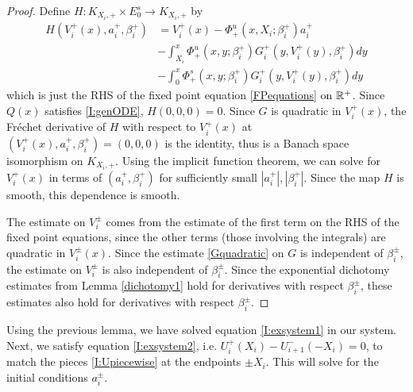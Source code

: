 \documentclass[thesis.tex]{subfiles}
\begin{document}
\begin{lemma}
\begin{proof}
Define $H: K_{X_i, +} \times E_0^s \rightarrow K_{X_i, +}$ by
\begin{align*}
H(V_i^+(x), a_i^+, \beta_i^+) &= V_i^+(x) - \Phi^u_+(x, X_i; \beta_i^+) a_i^+  \\
&- \int_{X_i}^x \Phi_+^u(x, y; \beta_i^+) G_i^+(y, V_i^+(y),\beta_i^+)dy \\
&- \int_0^x \Phi_+^s(x, y; \beta_i^+) G_i^+(y, V_i^+(y),\beta_i^+)dy 
\end{align*}
which is just the RHS of the fixed point equation \eqref{FPequations} on ${\mathbb R}^+$. Since $Q(x)$ satisfies \eqref{I:genODE}, $H(0, 0, 0) = 0$. Since $G$ is quadratic in $V_i^+(x)$, the Fr\'echet derivative of $H$ with respect to $V_i^+(x)$ at $(V_i^+(x), a_i^+, \beta_i^+) = (0, 0, 0)$ is the identity, thus is a Banach space isomorphism on $K_{X_i, +}$. Using the implicit function theorem, we can solve for $V_i^+(x)$ in terms of $(a_i^+, \beta_i^+)$ for sufficiently small $|a_i^+|, |\beta_i^+|$. Since the map $H$ is smooth, this dependence is smooth.

The estimate on $V_i^\pm$ comes from the estimate of the first term on the RHS of the fixed point equations, since the other terms (those involving the integrals) are quadratic in $V_i^\pm(x)$. Since the estimate \eqref{Gquadratic} on $G$ is independent of $\beta_i^\pm$, the estimate on {}$V_i^\pm$ is also independent of $\beta_i^\pm$. Since the exponential dichotomy estimates from Lemma \ref{dichotomy1} hold for derivatives with respect $\beta_i^\pm$, these estimates also hold for derivatives with respect $\beta_i^\pm$.
\end{proof}
\end{lemma}

Using the previous lemma, we have solved equation \eqref{I:exsystem1} in our system. Next, we satisfy equation \eqref{I:exsystem2}, i.e. $U_i^+(X_i) - U_{i+1}^-(-X_i) = 0$, to match the pieces \eqref{I:Upiecewise} at the endpoints $\pm X_i$. This will solve for the initial conditions $a_i^\pm$.

\end{document}

